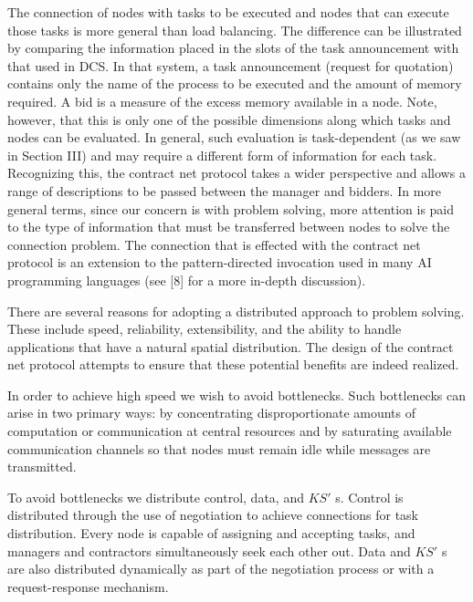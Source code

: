 \documentclass[
]{article}
\begin{document}
The connection of nodes with tasks to be executed and nodes that can
execute those tasks is more general than load balancing. The difference
can be illustrated by comparing the information placed in the slots of
the task announcement with that used in DCS. In that system, a task
announcement (request for quotation) contains only the name of the
process to be executed and the amount of memory required. A bid is a
measure of the excess memory available in a node. Note, however, that
this is only one of the possible dimensions along which tasks and nodes
can be evaluated. In general, such evaluation is task-dependent (as we
saw in Section III) and may require a different form of information for
each task. Recognizing this, the contract net protocol takes a wider
perspective and allows a range of descriptions to be passed between the
manager and bidders. In more general terms, since our concern is with
problem solving, more attention is paid to the type of information that
must be transferred between nodes to solve the connection problem. The
connection that is effected with the contract net protocol is an
extension to the pattern-directed invocation used in many AI programming
languages (see {[}8{]} for a more in-depth discussion).

There are several reasons for adopting a distributed approach to problem
solving. These include speed, reliability, extensibility, and the
ability to handle applications that have a natural spatial distribution.
The design of the contract net protocol attempts to ensure that these
potential benefits are indeed realized.

In order to achieve high speed we wish to avoid bottlenecks. Such
bottlenecks can arise in two primary ways: by concentrating
disproportionate amounts of computation or communication at central
resources and by saturating available communication channels so that
nodes must remain idle while messages are transmitted.

To avoid bottlenecks we distribute control, data, and \(KS'\) s. Control
is distributed through the use of negotiation to achieve connections for
task distribution. Every node is capable of assigning and accepting
tasks, and managers and contractors simultaneously seek each other out.
Data and \(KS'\) s are also distributed dynamically as part of the
negotiation process or with a request-response mechanism.
\end{document}
